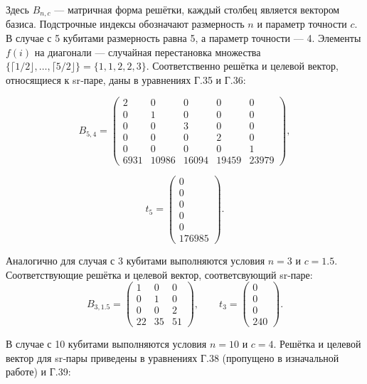 Здесь \(B_{n,c}\) — матричная форма решётки, каждый столбец является вектором
базиса. Подстрочные индексы обозначают размерность \(n\) и параметр точности
\(c\). В случае с 5 кубитами размерность равна 5, а параметр точности — 4.
Элементы \(f(i)\) на диагонали — случайная перестановка множества \(\{\lceil
1/2 \rfloor, \dots, \lceil 5/2 \rfloor\} = \{1, 1, 2, 2, 3\}\). Соответственно
решётка и целевой вектор, относящиеся к sr‑паре, даны в уравнениях Г.35 и Г.36:

\begin{equation}
B_{5,4}=
\begin{pmatrix}
2     & 0     & 0     & 0     & 0     \\
0     & 1     & 0     & 0     & 0     \\
0     & 0     & 3     & 0     & 0     \\
0     & 0     & 0     & 2     & 0     \\
0     & 0     & 0     & 0     & 1     \\
6931  & 10986 & 16094 & 19459 & 23979
\end{pmatrix},
\end{equation}

\begin{equation}
t_{5}=
\begin{pmatrix}
0\\
0\\
0\\
0\\
0\\
176985
\end{pmatrix}.
\end{equation}

Аналогично для случая с 3 кубитами выполняются условия \(n = 3\) и \(c = 1.5\).
Соответствующие решётка и целевой вектор, соответсвующий sr-паре:
\begin{equation}
B_{3,1.5} =
\begin{pmatrix}
1 & 0 & 0 \\
0 & 1 & 0 \\
0 & 0 & 2 \\
22 & 35 & 51
\end{pmatrix},
\qquad
t_{3} =
\begin{pmatrix}
0 \\ 0 \\ 0 \\ 240
\end{pmatrix}.
\end{equation}

В случае с 10 кубитами выполняются условия \(n = 10\) и \(c = 4\). Решётка и
целевой вектор для sr‑пары приведены в уравнениях Г.38 (пропущено в изначальной
работе) и Г.39:

